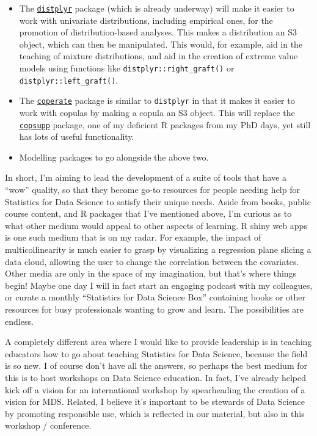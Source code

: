 \documentclass[]{article}
\providecommand{\tightlist}{%
  \setlength{\itemsep}{0pt}\setlength{\parskip}{0pt}}
\begin{document}
\begin{itemize}
\tightlist
\item
  The \href{https://github.com/vincenzocoia/distplyr/}{\texttt{distplyr}} package (which is already underway) will make it easier to work with univariate distributions, including empirical ones, for the promotion of distribution-based analyses. This makes a distribution an S3 object, which can then be manipulated. This would, for example, aid in the teaching of mixture distributions, and aid in the creation of extreme value models using functions like \texttt{distplyr::right\_graft()} or \texttt{distplyr::left\_graft()}.
\item
  The \href{https://github.com/vincenzocoia/coperate/}{\texttt{coperate}} package is similar to \texttt{distplyr} in that it makes it easier to work with copulas by making a copula an S3 object. This will replace the \href{https://github.com/vincenzocoia/copsupp/}{\texttt{copsupp}} package, one of my deficient R packages from my PhD days, yet still has lots of useful functionality.
\item
  Modelling packages to go alongside the above two.
\end{itemize}

In short, I'm aiming to lead the development of a suite of tools that have a ``wow'' quality, so that they become go-to resources for people needing help for Statistics for Data Science to satisfy their unique needs. Aside from books, public course content, and R packages that I've mentioned above, I'm curious as to what other medium would appeal to other aspects of learning. R shiny web apps is one such medium that is on my radar. For example, the impact of multicollinearity is much easier to grasp by visualizing a regression plane slicing a data cloud, allowing the user to change the correlation between the covariates. Other media are only in the space of my imagination, but that's where things begin! Maybe one day I will in fact start an engaging podcast with my colleagues, or curate a monthly ``Statistics for Data Science Box'' containing books or other resources for busy professionals wanting to grow and learn. The possibilities are endless.

A completely different area where I would like to provide leadership is in teaching educators how to go about teaching Statistics for Data Science, because the field is so new. I of course don't have all the answers, so perhaps the best medium for this is to host workshops on Data Science education. In fact, I've already helped kick off a vision for an international workshop by spearheading the creation of a vision for MDS. Related, I believe it's important to be stewards of Data Science by promoting responsible use, which is reflected in our material, but also in this workshop / conference.
\end{document}

